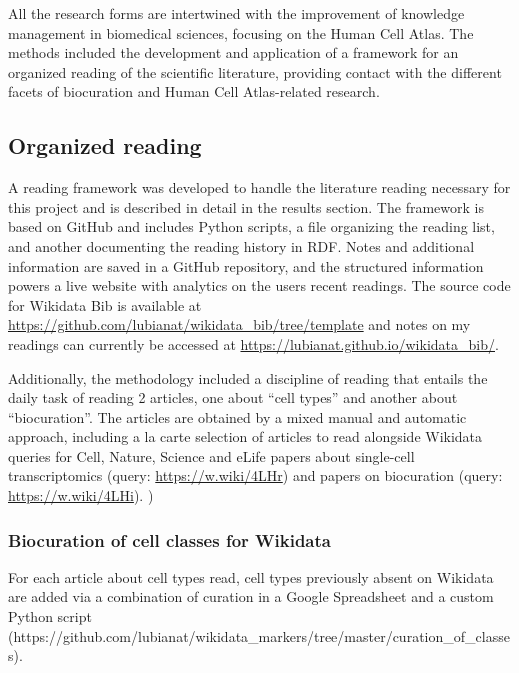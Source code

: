 All the research forms are intertwined with the improvement of knowledge management in biomedical sciences, focusing on the Human Cell Atlas.
The methods included the development and application of a framework for an organized reading of the scientific literature, providing contact with the different facets of biocuration and Human Cell Atlas-related research.

\hypertarget{organized-reading}{%
\subsection{Organized reading}\label{organized-reading}}

A reading framework was developed to handle the literature reading necessary for this project and is described in detail in the results section.
The framework is based on GitHub and includes Python scripts, a file organizing the reading list, and another documenting the reading history in RDF.
Notes and additional information are saved in a GitHub repository, and the structured information powers a live website with analytics on the users recent readings.
The source code for Wikidata Bib is available at \url{https://github.com/lubianat/wikidata_bib/tree/template} and notes on my readings can currently be accessed at \url{https://lubianat.github.io/wikidata_bib/}.

Additionally, the methodology included a discipline of reading that entails the daily task of reading 2 articles, one about ``cell types'' and another about ``biocuration''.
The articles are obtained by a mixed manual and automatic approach, including a la carte selection of articles to read alongside Wikidata queries for Cell, Nature, Science and eLife papers about single-cell transcriptomics (query: \url{https://w.wiki/4LHr}) and papers on biocuration (query: \url{https://w.wiki/4LHi}).
)

\hypertarget{biocuration-of-cell-classes-for-wikidata}{%
\subsubsection{Biocuration of cell classes for Wikidata}\label{biocuration-of-cell-classes-for-wikidata}}

For each article about cell types read, cell types previously absent on Wikidata are added via a combination of curation in a Google Spreadsheet and a custom Python script (https://github.com/lubianat/wikidata\_markers/tree/master/curation\_of\_classes).


